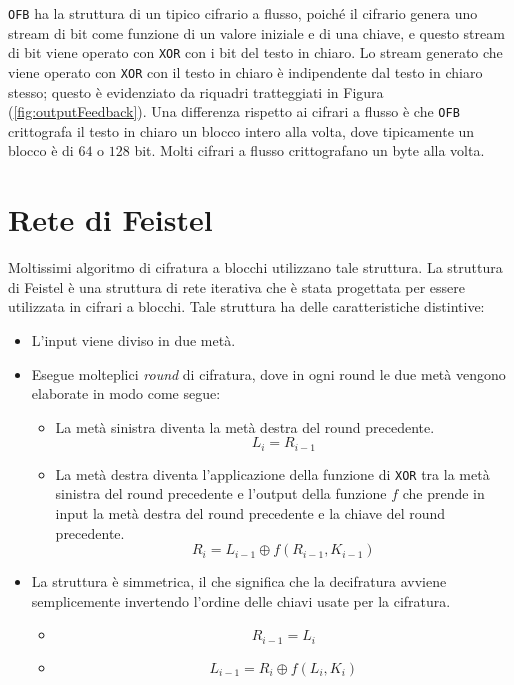 \verb|OFB| ha la struttura di un tipico cifrario a flusso, poiché il cifrario
genera uno stream di bit come funzione di un valore iniziale e di una chiave,
e questo stream di bit viene operato con \verb|XOR| con i bit del testo in chiaro.
Lo stream generato che viene operato con \verb|XOR| con il testo in chiaro è
indipendente dal testo in chiaro stesso; questo è evidenziato da riquadri
tratteggiati in Figura (\ref{fig:outputFeedback}). Una differenza rispetto
ai cifrari a flusso è che \verb|OFB| crittografa il testo in chiaro un blocco
intero alla volta, dove tipicamente un blocco è di $64$ o $128$ bit. Molti
cifrari a flusso crittografano un byte alla volta.

\section{Rete di Feistel}
Moltissimi algoritmo di cifratura a blocchi utilizzano tale struttura.
La struttura di Feistel è una struttura di rete iterativa che è stata
progettata per essere utilizzata in cifrari a blocchi.
Tale struttura ha delle caratteristiche distintive:
\begin{itemize}
    \item L'input viene diviso in due metà.
    \item Esegue molteplici \textit{round} di cifratura, dove in ogni round 
    le due metà vengono elaborate in modo come segue:
    \begin{itemize}
        \item La metà sinistra diventa la metà destra del round precedente.
        \[
          L_i = R_{i-1}  
        \]
        \item La metà destra diventa l'applicazione della funzione di \texttt{XOR}
        tra la metà sinistra del round precedente e l'output della funzione $f$ che prende 
        in input la metà destra del round precedente e la chiave del round precedente.
        \[
            R_i = L_{i-1} \oplus f(R_{i-1}, K_{i-1})
        \]
    \end{itemize}
    \item La struttura è simmetrica, il che significa che la decifratura 
    avviene semplicemente invertendo l'ordine delle chiavi usate per la cifratura.
    \begin{itemize}
        \item \[ R_{i-1} = L_i \]
        \item \[L_{i-1} = R_i \oplus f(L_i, K_i)\]
    \end{itemize}
\end{itemize}
